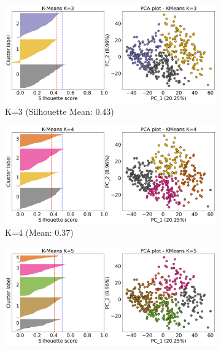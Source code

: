 \begin{figure}[!t]
    \captionsetup[subfigure]{justification=Centering}
    \centering
    \begin{subfigure}[!t]{0.49\textwidth}
        \includegraphics[width=\textwidth]{Sections/ClusteringAnalysis/Resources/cs_top3/sill_distrib/KMeans_3_sill_distrib.png}
        \caption{K=3 (Silhouette Mean: $0.43$)}
    \end{subfigure}
    \centering
    \begin{subfigure}[!t]{0.49\textwidth}
        \includegraphics[width=\textwidth]{Sections/ClusteringAnalysis/Resources/cs_top3/sill_distrib/KMeans_4_sill_distrib.png}
        \caption{K=4 (Mean: $0.37$)}
    \end{subfigure}
    \centering
    \begin{subfigure}[!t]{0.49\textwidth}
        \includegraphics[width=\textwidth]{Sections/ClusteringAnalysis/Resources/cs_top3/sill_distrib/KMeans_5_sill_distrib.png}

\end{subfigure}
\end{figure}

